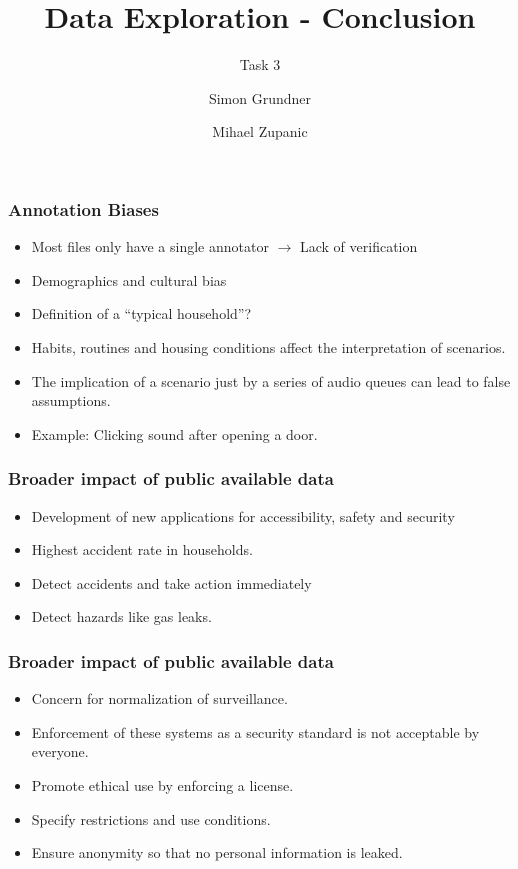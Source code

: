 \documentclass[
    utf8,
    aspectratio=169,
    ngerman,
    english,
    handout
]{beamer}
\begin{document}

\title{Data Exploration - Conclusion}
\subtitle{Task 3}

\author{Simon Grundner \and Mihael Zupanic}

\date[\today]{}



\maketitle

\begin{frame}
\frametitle{Annotation Biases}
\begin{itemize}
\item Most files only have a single annotator $\rightarrow$ Lack of verification
\item Demographics and cultural bias
\item Definition of a ``typical household''?
\item Habits, routines and housing conditions affect the interpretation of scenarios.
\item The implication of a scenario just by a series of audio queues can lead to false assumptions.
\item Example: Clicking sound after opening a door.
\end{itemize}
\end{frame}

\begin{frame}
\frametitle{Broader impact of public available data}
\begin{itemize}
\item Development of new applications for accessibility, safety and security
\item Highest accident rate in households.
\item Detect accidents and take action immediately
\item Detect hazards like gas leaks.
\end{itemize}
\end{frame}

\begin{frame}
\frametitle{Broader impact of public available data}
\begin{itemize}
\item Concern for normalization of surveillance.
\item Enforcement of these systems as a security standard is not acceptable by everyone.
\item Promote ethical use by enforcing a license.
\item Specify restrictions and use conditions.
\item Ensure anonymity so that no personal information is leaked.
\end{itemize}
\end{frame}
\end{document}
